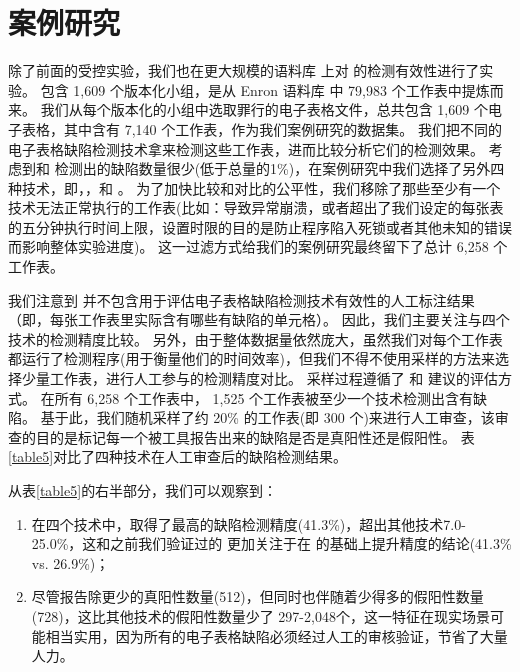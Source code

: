 \section{案例研究}




除了前面的受控实验，我们也在更大规模的语料库 \ven \cite{xu2017spreadcluster} 上对 \wa 的检测有效性进行了实验。
\ven 包含 1,609 个版本化小组，是从 Enron 语料库 \cite{hermans2015enron} 中 79,983 个工作表中提炼而来。
我们从每个版本化的小组中选取罪行的电子表格文件，总共包含 1,609 个电子表格，其中含有 7,140 个工作表，作为我们案例研究的数据集。
我们把不同的电子表格缺陷检测技术拿来检测这些工作表，进而比较分析它们的检测效果。
考虑到\uc 和 \di 检测出的缺陷数量很少(低于总量的1\%)，在案例研究中我们选择了另外四种技术，即\am ，\ca  ，\cu 和 \wa 。
为了加快比较和对比的公平性，我们移除了那些至少有一个技术无法正常执行的工作表(比如：导致异常崩溃，或者超出了我们设定的每张表的五分钟执行时间上限，设置时限的目的是防止程序陷入死锁或者其他未知的错误而影响整体实验进度)。
这一过滤方式给我们的案例研究最终留下了总计 6,258 个工作表。

我们注意到 \ven 并不包含用于评估电子表格缺陷检测技术有效性的人工标注结果（即，每张工作表里实际含有哪些有缺陷的单元格）。
因此，我们主要关注与四个技术的检测精度比较。
另外，由于整体数据量依然庞大，虽然我们对每个工作表都运行了检测程序(用于衡量他们的时间效率)，但我们不得不使用采样的方法来选择少量工作表，进行人工参与的检测精度对比。
采样过程遵循了 \am 和 \cu 建议的评估方式。
在所有 6,258 个工作表中， 1,525 个工作表被至少一个技术检测出含有缺陷。
基于此，我们随机采样了约 20\% 的工作表(即 300 个)来进行人工审查，该审查的目的是标记每一个被工具报告出来的缺陷是否是真阳性还是假阳性。
表\ref{table5}对比了四种技术在人工审查后的缺陷检测结果。

从表\ref{table5}的右半部分，我们可以观察到：
\begin{enumerate}
    \item 在四个技术中，\wa 取得了最高的缺陷检测精度(41.3\%)，超出其他技术7.0-25.0\%，这和之前我们验证过的 \wa 更加关注于在 \cu 的基础上提升精度的结论(41.3\% vs. 26.9\%)；
    \item 尽管\wa 报告除更少的真阳性数量(512)，但同时也伴随着少得多的假阳性数量(728)，这比其他技术的假阳性数量少了 297-2,048个，这一特征在现实场景可能相当实用，因为所有的电子表格缺陷必须经过人工的审核验证，节省了大量人力。
\end{enumerate}


